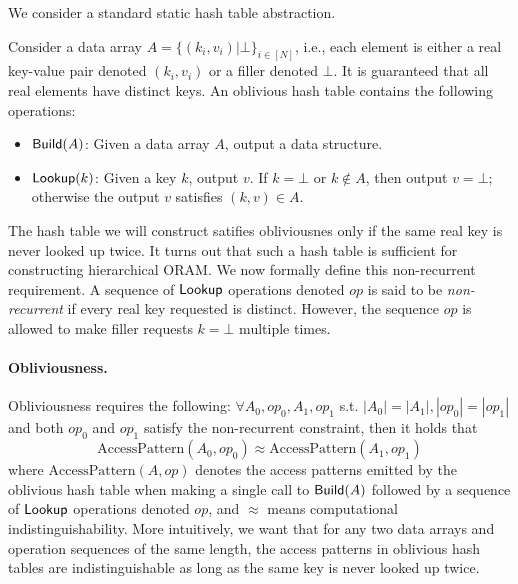 We consider a standard static hash table abstraction.
\begin{definition}
    Consider a data array $A = \{ (k_i, v_i) | \bot \}_{i \in [N]}$, i.e., 
each element is either a real key-value pair denoted $(k_i, v_i)$ 
or a filler denoted $\bot$. It is guaranteed that all real elements have distinct keys. An oblivious hash table contains the following operations:
    \begin{itemize}
      \item ${\sf Build}(A)$: Given a data array $A$, output a data structure.
      \item ${\sf Lookup}(k)$: Given a key $k$, output $v$. If $k = \bot$ or $k \notin A$, then output 
$v = \bot$; otherwise the output $v$ satisfies 
$(k, v) \in A$. 
    \end{itemize}

The hash table 
we will construct satifies
obliviousnes only if the same real key
is never looked up twice. 
It turns out that such a hash table 
is sufficient for constructing hierarchical ORAM.
We now formally define this non-recurrent requirement. 
A sequence of ${\sf Lookup}$ operations denoted $op$
is said to be {\it non-recurrent} if 
every real key requested is distinct. However, the sequence  
$op$ is allowed to make filler requests $k = \bot$ multiple times. 

\paragraph{Obliviousness.} Obliviousness requires the following: 
    $\forall A_0, op_0, A_1, op_1$ s.t. $|A_0| = |A_1|, |op_0| = |op_1|$ and both $op_0$ and $op_1$ satisfy the non-recurrent constraint, 
then %
it holds that 
    $$\text{AccessPattern}(A_0, op_0) \approx \text{AccessPattern}(A_1, op_1)$$
where $\text{AccessPattern}(A, op)$ denotes
the access patterns emitted
by the oblivious hash table 
when making a single call to ${\sf Build}(A)$
followed by a sequence of ${\sf Lookup}$ operations denoted $op$, 
and $\approx$ means computational indistinguishability.
More intuitively, 
we want that for any two data arrays and operation sequences of the same length, 
the access patterns in oblivious hash tables are indistinguishable as long as the same key is never looked up twice.
\end{definition}

